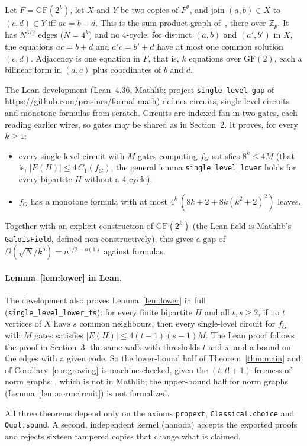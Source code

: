 \documentclass[11pt]{article}
\theoremstyle{definition}
\theoremstyle{remark}
\newcommand{\GF}{\mathrm{GF}}
\newcommand{\Cone}{C_1}
\begin{document}
Let $F=\GF(2^k)$, let $X$ and $Y$ be two copies of $F^2$, and join $(a,b)\in X$ to $(c,d)\in Y$ iff $ac=b+d$. This is
the sum-product graph of~\cite[Sect.~7.2]{BFC}, there over $\mathbb Z_p$. It has $N^{3/2}$ edges ($N=4^k$) and no 4-cycle: for distinct $(a,b)$
and $(a',b')$ in $X$, the equations $ac=b+d$ and $a'c=b'+d$ have at most one common solution $(c,d)$. Adjacency is one
equation in $F$, that is, $k$ equations over $\GF(2)$, each a bilinear form in $(a,c)$ plus coordinates of $b$ and $d$.

The Lean development (Lean~4.36, Mathlib; project \texttt{single-level-gap} of
\url{https://github.com/prasincs/formal-math}) defines circuits, single-level circuits and monotone formulas from
scratch. Circuits are indexed fan-in-two gates, each reading earlier wires, so gates may be shared as in Section~2. It
proves, for every $k\ge 1$:
\begin{itemize}
\item every single-level circuit with $M$ gates computing $f_G$ satisfies $8^k\le 4M$ (that is,
$|E(H)|\le 4\,\Cone(f_G)$; the general lemma \texttt{single\_level\_lower} holds for every bipartite $H$ without a
4-cycle);
\item $f_G$ has a monotone formula with at most $4^k\,(8k+2+8k(k^2+2)^2)$ leaves.
\end{itemize}
Together with an explicit construction of
$\GF(2^k)$ (the Lean field is Mathlib's \texttt{GaloisField}, defined non-constructively), this gives a gap of
$\Omega(\sqrt N/k^5)=n^{1/2-o(1)}$ against formulas.

\paragraph{Lemma~\ref{lem:lower} in Lean.} The development also proves Lemma~\ref{lem:lower} in full
(\texttt{single\_level\_lower\_ts}): for every finite bipartite $H$ and all $t,s\ge 2$, if no $t$ vertices of $X$ have
$s$ common neighbours, then every single-level circuit for $f_G$ with $M$ gates satisfies $|E(H)|\le 4(t-1)(s-1)M$. The
Lean proof follows the proof in Section~3: the same walk with thresholds $t$ and $s$, and a bound on the edges with a given
code. So the lower-bound half of Theorem~\ref{thm:main} and of Corollary~\ref{cor:growing} is machine-checked, given
the $(t,t!+1)$-freeness of norm graphs~\cite{KRS96}, which is not in Mathlib; the upper-bound half for norm graphs
(Lemma~\ref{lem:normcircuit}) is not formalized.

All three theorems depend only on the axioms \texttt{propext}, \texttt{Classical.choice} and \texttt{Quot.sound}. A
second, independent kernel (nanoda) accepts the exported proofs and rejects sixteen tampered copies that change what is
claimed.
\end{document}
